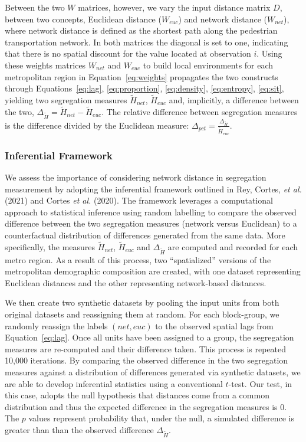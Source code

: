 \documentclass[
  10pt,
]{article}
\begin{document}
Between the two \(W\) matrices, however, we vary the input distance
matrix \(D\), between two concepts, Euclidean distance (\(W_{euc}\)) and
network distance (\(W_{net}\)), where network distance is defined as the
shortest path along the pedestrian transportation network. In both
matrices the diagonal is set to one, indicating that there is no spatial
discount for the value located at observation \(i\). Using these weights
matrices \(W_{net}\) and \(W_{euc}\) to build local environments for
each metropolitan region in Equation~\ref{eq:weights} propagates the two
constructs through
Equations~\ref{eq:lag}, \ref{eq:proportion}, \ref{eq:density}, \ref{eq:entropy}, \ref{eq:sit},
yielding two segregation measures \(\tilde{H}_{net}\),
\(\tilde{H}_{euc}\) and, implicitly, a difference between the two,
\(\Delta_{\tilde{H}} = \tilde{H}_{net} - \tilde{H}_{euc}\). The relative
difference between segregation measures is the difference divided by the
Euclidean measure:
\(\Delta_{pct} = \frac{\Delta_{\tilde{H}}}{\tilde{H}_{euc}}\).

\hypertarget{inferential-framework}{%
\subsubsection{Inferential Framework}\label{inferential-framework}}

We assess the importance of considering network distance in segregation
measurement by adopting the inferential framework outlined in Rey,
Cortes, \emph{et al.} (2021) and Cortes \emph{et al.} (2020). The
framework leverages a computational approach to statistical inference
using random labelling to compare the observed difference between the
two segregation measures (network versus Euclidean) to a counterfactual
distribution of differences generated from the same data. More
specifically, the measures \(\tilde{H}_{net}\), \(\tilde{H}_{euc}\) and
\(\Delta_{\tilde{H}}\) are computed and recorded for each metro region.
As a result of this process, two ``spatialized'' versions of the
metropolitan demographic composition are created, with one dataset
representing Euclidean distances and the other representing
network-based distances.

We then create two synthetic datasets by pooling the input units from
both original datasets and reassigning them at random. For each
block-group, we randomly reassign the labels \((net,euc)\) to the
observed spatial lags from Equation~\ref{eq:lag}. Once all units have
been assigned to a group, the segregation measures are re-computed and
their difference taken. This process is repeated 10,000 iterations. By
comparing the observed difference in the two segregation measures
against a distribution of differences generated via synthetic datasets,
we are able to develop inferential statistics using a conventional
\(t\)-test. Our test, in this case, adopts the null hypothesis that
distances come from a common distribution and thus the expected
difference in the segregation measures is 0. The \(p\) values represent
probability that, under the null, a simulated difference is greater than
than the observed difference \(\Delta_{\tilde{H}}\).
\end{document}
